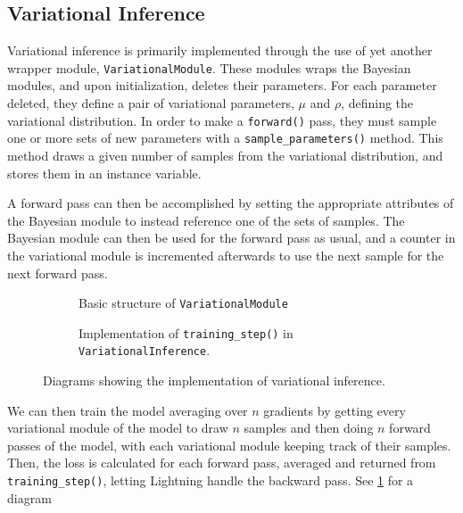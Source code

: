 \subsection{Variational Inference}
Variational inference is primarily implemented through the use of yet another wrapper module, \texttt{VariationalModule}.
These modules wraps the Bayesian modules, and upon initialization, deletes their parameters.
For each parameter deleted, they define a pair of variational parameters, $\mu$ and $\rho$, defining the variational distribution. 
In order to make a \texttt{forward()} pass, they must sample one or more sets of new parameters with a \texttt{sample\_parameters()} method.
This method draws a given number of samples from the variational distribution, and stores them in an instance variable.

A forward pass can then be accomplished by setting the appropriate attributes of the Bayesian module to instead reference one of the sets of samples. 
The Bayesian module can then be used for the forward pass as usual, and a counter in the variational module is incremented afterwards to use the next sample for the next forward pass.
\begin{figure}[htbp]
    \centering
    \begin{subfigure}[b]{0.48\linewidth}
        \centering
        \caption{Basic structure of \texttt{VariationalModule}}
        
    \end{subfigure}
    \begin{subfigure}[b]{0.48\linewidth}
        \centering
        \caption{Implementation of \texttt{training\_step()} in \texttt{VariationalInference}.}
        
    \end{subfigure}
    \caption{Diagrams showing the implementation of variational inference.}
    \label{fig:vi-arch}
\end{figure}
We can then train the model averaging over $n$ gradients by getting every variational module of the model to draw $n$ samples and then doing $n$ forward passes of the model, with each variational module keeping track of their samples.
Then, the loss is calculated for each forward pass, averaged and returned from \texttt{training\_step()}, letting Lightning handle the backward pass. 
See \cref{fig:vi-arch} for a diagram 


